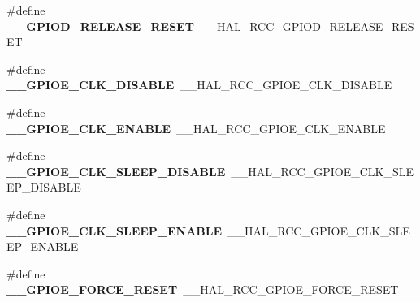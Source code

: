 \begin{DoxyCompactItemize}
\item 
\#define {\bfseries \+\_\+\+\_\+\+G\+P\+I\+O\+D\+\_\+\+R\+E\+L\+E\+A\+S\+E\+\_\+\+R\+E\+S\+ET}~\+\_\+\+\_\+\+H\+A\+L\+\_\+\+R\+C\+C\+\_\+\+G\+P\+I\+O\+D\+\_\+\+R\+E\+L\+E\+A\+S\+E\+\_\+\+R\+E\+S\+ET\hypertarget{group___h_a_l___r_c_c___aliased_gadffaea7e6b49f7d50e4d0bff38d3a4da}{}\label{group___h_a_l___r_c_c___aliased_gadffaea7e6b49f7d50e4d0bff38d3a4da}

\item 
\#define {\bfseries \+\_\+\+\_\+\+G\+P\+I\+O\+E\+\_\+\+C\+L\+K\+\_\+\+D\+I\+S\+A\+B\+LE}~\+\_\+\+\_\+\+H\+A\+L\+\_\+\+R\+C\+C\+\_\+\+G\+P\+I\+O\+E\+\_\+\+C\+L\+K\+\_\+\+D\+I\+S\+A\+B\+LE\hypertarget{group___h_a_l___r_c_c___aliased_ga8181ceafa56a5eb16680e0fe30bb5fe1}{}\label{group___h_a_l___r_c_c___aliased_ga8181ceafa56a5eb16680e0fe30bb5fe1}

\item 
\#define {\bfseries \+\_\+\+\_\+\+G\+P\+I\+O\+E\+\_\+\+C\+L\+K\+\_\+\+E\+N\+A\+B\+LE}~\+\_\+\+\_\+\+H\+A\+L\+\_\+\+R\+C\+C\+\_\+\+G\+P\+I\+O\+E\+\_\+\+C\+L\+K\+\_\+\+E\+N\+A\+B\+LE\hypertarget{group___h_a_l___r_c_c___aliased_ga3dc0f8e57701da6357860c08670c1898}{}\label{group___h_a_l___r_c_c___aliased_ga3dc0f8e57701da6357860c08670c1898}

\item 
\#define {\bfseries \+\_\+\+\_\+\+G\+P\+I\+O\+E\+\_\+\+C\+L\+K\+\_\+\+S\+L\+E\+E\+P\+\_\+\+D\+I\+S\+A\+B\+LE}~\+\_\+\+\_\+\+H\+A\+L\+\_\+\+R\+C\+C\+\_\+\+G\+P\+I\+O\+E\+\_\+\+C\+L\+K\+\_\+\+S\+L\+E\+E\+P\+\_\+\+D\+I\+S\+A\+B\+LE\hypertarget{group___h_a_l___r_c_c___aliased_ga6aed41e94b90a11cbe6c4798ee3b3b9a}{}\label{group___h_a_l___r_c_c___aliased_ga6aed41e94b90a11cbe6c4798ee3b3b9a}

\item 
\#define {\bfseries \+\_\+\+\_\+\+G\+P\+I\+O\+E\+\_\+\+C\+L\+K\+\_\+\+S\+L\+E\+E\+P\+\_\+\+E\+N\+A\+B\+LE}~\+\_\+\+\_\+\+H\+A\+L\+\_\+\+R\+C\+C\+\_\+\+G\+P\+I\+O\+E\+\_\+\+C\+L\+K\+\_\+\+S\+L\+E\+E\+P\+\_\+\+E\+N\+A\+B\+LE\hypertarget{group___h_a_l___r_c_c___aliased_gadc6371db865d9313fbe560c6f25e0768}{}\label{group___h_a_l___r_c_c___aliased_gadc6371db865d9313fbe560c6f25e0768}

\item 
\#define {\bfseries \+\_\+\+\_\+\+G\+P\+I\+O\+E\+\_\+\+F\+O\+R\+C\+E\+\_\+\+R\+E\+S\+ET}~\+\_\+\+\_\+\+H\+A\+L\+\_\+\+R\+C\+C\+\_\+\+G\+P\+I\+O\+E\+\_\+\+F\+O\+R\+C\+E\+\_\+\+R\+E\+S\+ET\hypertarget{group___h_a_l___r_c_c___aliased_gafdfb826bee2c22e04ac51953aeaf3d17}{}\label{group___h_a_l___r_c_c___aliased_gafdfb826bee2c22e04ac51953aeaf3d17}


\end{DoxyCompactItemize}
